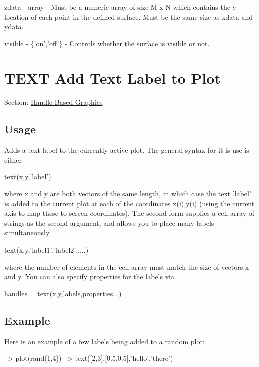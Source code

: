 \begin{DoxyItemize}
\item {\ttfamily zdata} -\/ {\ttfamily array} -\/ Must be a numeric array of size {\ttfamily M x N} which contains the y location of each point in the defined surface. Must be the same size as {\ttfamily xdata} and {\ttfamily ydata}.  
\item {\ttfamily visible} -\/ {\ttfamily \{'on','off'\}} -\/ Controls whether the surface is visible or not.  
\end{DoxyItemize}\hypertarget{handle_text}{}\section{T\-E\-X\-T Add Text Label to Plot}\label{handle_text}
Section\-: \hyperlink{sec_handle}{Handle-\/\-Based Graphics} \hypertarget{vtkwidgets_vtkxyplotwidget_Usage}{}\subsection{Usage}\label{vtkwidgets_vtkxyplotwidget_Usage}
Adds a text label to the currently active plot. The general syntax for it is use is either \begin{DoxyVerb}   text(x,y,'label')
\end{DoxyVerb}
 where {\ttfamily x} and {\ttfamily y} are both vectors of the same length, in which case the text {\ttfamily 'label'} is added to the current plot at each of the coordinates {\ttfamily x(i),y(i)} (using the current axis to map these to screen coordinates). The second form supplies a cell-\/array of strings as the second argument, and allows you to place many labels simultaneously \begin{DoxyVerb}   text(x,y,{'label1','label2',....})
\end{DoxyVerb}
 where the number of elements in the cell array must match the size of vectors {\ttfamily x} and {\ttfamily y}. You can also specify properties for the labels via \begin{DoxyVerb}   handles = text(x,y,{labels},properties...)
\end{DoxyVerb}
 \hypertarget{variables_struct_Example}{}\subsection{Example}\label{variables_struct_Example}
Here is an example of a few labels being added to a random plot\-:


\begin{DoxyVerbInclude}
--> plot(rand(1,4))
--> text([2,3],[0.5,0.5],{'hello','there'})
\end{DoxyVerbInclude}


